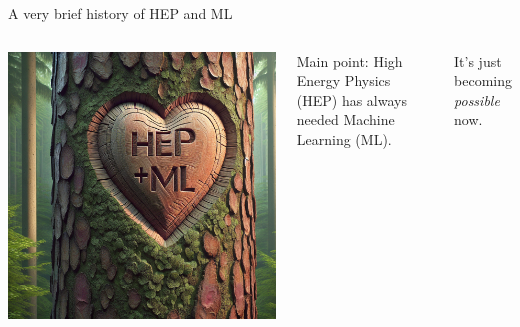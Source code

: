 \documentclass[aspectratio=169]{beamer}
\begin{document}
\begin{frame}{A very brief history of HEP and ML}
\Large
\vspace{0.5 cm}
\begin{columns}
\includegraphics[width=\linewidth]{img/hep-plus-ml.jpg}

Main point: High Energy Physics (HEP) has always needed Machine Learning (ML).

\vspace{0.5 cm}
It's just becoming {\it possible} now.
\end{columns}
\end{frame}
\end{document}
